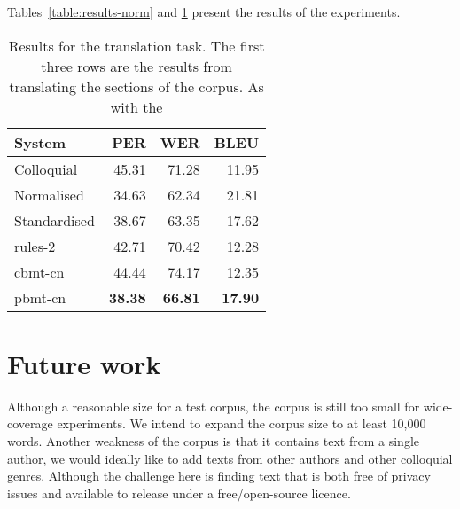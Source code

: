 \documentclass[11pt]{article}
\begin{document}
Tables~\ref{table:results-norm} and \ref{table:results-trad} present the results of the experiments. 




\begin{table}
  \centering
  \begin{tabular}{|l|r|r|r|}
     \hline
    \textbf{System} & \textbf{PER} & \textbf{WER} & \textbf{BLEU} \\
     \hline
     Colloquial   & 45.31 & 71.28 & 11.95 \\
     Normalised   & 34.63 & 62.34 & 21.81 \\
     Standardised & 38.67 & 63.35 & 17.62 \\
     \hline
     rules-2      & 42.71 & 70.42 & 12.28 \\
     \hline
     cbmt-cn      & 44.44 & 74.17 & 12.35 \\
     pbmt-cn      & \textbf{38.38} & \textbf{66.81} & \textbf{17.90} \\
     \hline
  \end{tabular}
  \caption{Results for the translation task. The first three rows are the results 
    from translating the sections of the corpus. As with the }
  \label{table:results-trad}
\end{table}




\section{Future work}

% 

Although a reasonable size for a test corpus, the corpus is still too small for 
wide-coverage experiments. We intend to expand the corpus size to at least 10,000
words. Another weakness of the corpus is that it contains text from a single author,
we would ideally like to add texts from other authors and other colloquial genres. Although
the challenge here is finding text that is both free of privacy issues and available
to release under a free/open-source licence.
\end{document}
